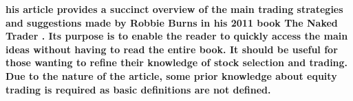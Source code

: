 \textbf{his article provides a succinct overview of the main trading strategies and suggestions made by Robbie Burns in his 2011 book The Naked Trader \cite{burns2011}. Its purpose is to enable the reader to quickly access the main ideas without having to read the entire book. It should be useful for those wanting to refine their knowledge of stock selection and trading. Due to the nature of the article, some prior knowledge about equity trading is required as basic definitions are not defined.} 
